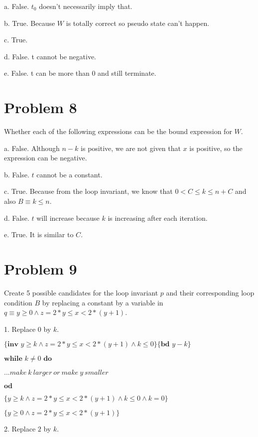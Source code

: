 \documentclass{article}
\begin{document}
a. False. $t_0$ doesn't necessarily imply that.

b. True. Because $W$ is totally correct so pseudo state can't happen.

c. True.

d. False. t cannot be negative.

e. False. t can be more than 0 and still terminate.


\section*{Problem 8}

Whether each of the following expressions can be the bound expression for $W$.

a. False. Although $n-k$ is positive, we are not given that $x$ is positive, so the expression can be negative.

b. False. $t$ cannot be a constant.

c. True. Because from the loop invariant, we know that $0<C \leq k \leq n+C$ and also $B \equiv k \leq n$.

d. False. $t$ will increase because $k$ is increasing after each iteration.

e. True. It is similar to $C$.


\section*{Problem 9}

Create 5 possible candidates for the loop invariant $p$ and their corresponding loop condition $B$ by replacing a constant by a variable in $q \equiv y \geq 0 \wedge z=2*y \leq x < 2*(y+1)$.

\vspace{10pt}

1. Replace $0$ by $k$.
\vspace{10pt}

$\{\textbf{inv } y \geq k \wedge z=2*y \leq x < 2*(y+1) \wedge k \leq 0\} \{\textbf{bd } y-k\}$

$\textbf{while } k \neq 0 \textbf{ do}$

\qquad \qquad $...make\ k\ larger\ or\ make\ y\ smaller$

$\textbf{od}$

$\{y \geq k \wedge z=2*y \leq x < 2*(y+1) \wedge k \leq 0 \wedge k=0\}$

$\{y \geq 0 \wedge z=2*y \leq x < 2*(y+1)\}$

\vspace{10pt}
2. Replace $2$ by $k$.
\vspace{10pt}
\end{document}
